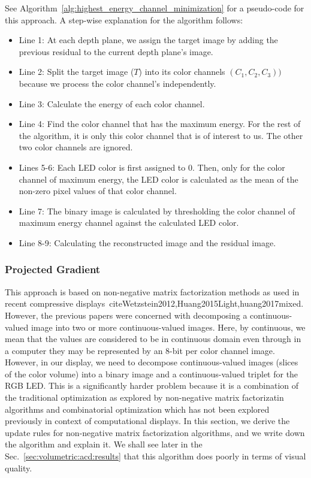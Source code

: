 See Algorithm~\ref{alg:highest_energy_channel_minimization} for a pseudo-code for this approach. A step-wise explanation for the algorithm follows:
\begin{itemize}
    \item Line 1: At each depth plane, we assign the target image by adding the previous residual to the current depth plane's image. 
    \item Line 2: Split the target image ($T$) into its color channels $(C_1, C_2, C_3))$ because we process the color channel's independently.
    \item Line 3: Calculate the energy of each color channel.
    \item Line 4: Find the color channel that has the maximum energy. For the rest of the algorithm, it is only this color channel that is of interest to us. The other two color channels are ignored.
    \item Lines 5-6: Each LED color is first assigned to 0. Then, only for the color channel of maximum energy, the LED color is calculated as the mean of the non-zero pixel values of that color channel.
    \item Line 7: The binary image is calculated by thresholding the color channel of maximum energy channel against the calculated LED color.
    \item Line 8-9: Calculating the reconstructed image and the residual image.
 \end{itemize}


\subsubsection{Projected Gradient}
\label{sec:acd:projected_gradient}
This approach is based on non-negative matrix factorization methods as used in recent compressive displays~cite{Wetzstein2012,Huang2015Light,huang2017mixed}. 
However, the previous papers were concerned with decomposing a continuous-valued image into two or more continuous-valued images. 
Here, by continuous, we mean that the values are considered to be in continuous domain even through in a computer they may be represented by an 8-bit per color channel image. 
However, in our display, we need to decompose continuous-valued images (slices of the color volume) into a binary image and a continuous-valued triplet for the RGB LED. 
This is a significantly harder problem because it is a combination of the traditional optimization as explored by non-negative matrix factorizatin algorithms and combinatorial optimization which has not been explored previously in context of computational displays. 
In this section, we derive the update rules for non-negative matrix factorization algorithms, and we write down the algorithm and explain it.
We shall see later in the Sec.~\ref{sec:volumetric:acd:results} that this algorithm does poorly in terms of visual quality.

